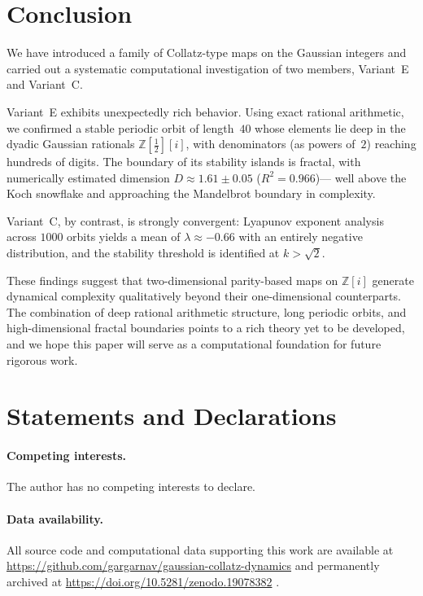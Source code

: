 \documentclass[12pt]{article}
\theoremstyle{plain}
\theoremstyle{definition}
\theoremstyle{remark}
\theoremstyle{definition}
\newcommand{\Z}{\mathbb{Z}}
\newcommand{\Zi}{\mathbb{Z}[i]}
\begin{document}
\section{Conclusion}

We have introduced a family of Collatz-type maps on the Gaussian
integers and carried out a systematic computational investigation
of two members, Variant~E and Variant~C.

Variant~E exhibits unexpectedly rich behavior.
Using exact rational arithmetic, we confirmed a stable periodic
orbit of length~$40$ whose elements lie deep in the dyadic
Gaussian rationals $\Z[\tfrac{1}{2}][i]$, with denominators
(as powers of~$2$) reaching hundreds of digits.
The boundary of its stability islands is fractal, with numerically
estimated dimension $D \approx 1.61 \pm 0.05$ ($R^2 = 0.966$)---
well above the Koch snowflake and approaching the Mandelbrot
boundary in complexity.

Variant~C, by contrast, is strongly convergent: Lyapunov exponent
analysis across $1000$ orbits yields a mean of $\lambda \approx -0.66$
with an entirely negative distribution, and the stability threshold
is identified at $k > \sqrt{2}$.

These findings suggest that two-dimensional parity-based maps on
$\Zi$ generate dynamical complexity qualitatively beyond their
one-dimensional counterparts.
The combination of deep rational arithmetic structure, long periodic
orbits, and high-dimensional fractal boundaries points to a rich
theory yet to be developed, and we hope this paper will serve as a
computational foundation for future rigorous work.


\section*{Statements and Declarations}

\paragraph{Competing interests.}
The author has no competing interests to declare.

\paragraph{Data availability.}
All source code and computational data supporting this work are
available at \url{https://github.com/gargarnav/gaussian-collatz-dynamics}
and permanently archived at \url{https://doi.org/10.5281/zenodo.19078382}
\cite{garg2026zenodo}.
\end{document}
